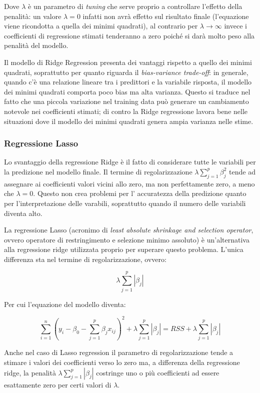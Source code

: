 Dove $\lambda$ è un parametro di \textit{tuning} che serve proprio a controllare l’effetto della penalità: un valore $\lambda=0$ infatti non avrà effetto sul risultato finale (l’equazione viene ricondotta a quella dei minimi quadrati), al contrario per $\lambda \to \infty$ invece i coefficienti di regressione stimati tenderanno a zero poiché si darà molto peso alla penalità del modello. \cite{lasso_vs_ridge}

Il modello di Ridge Regression presenta dei vantaggi rispetto a quello dei minimi quadrati, soprattutto per quanto riguarda il \textit{bias-variance trade-off}: in generale, quando c’è una relazione lineare tra i predittori e la variabile risposta, il modello dei minimi quadrati comporta poco bias ma alta varianza. Questo si traduce nel fatto che una piccola variazione nel training data può generare un cambiamento notevole nei coefficienti stimati; di contro la Ridge regressione lavora bene nelle situazioni dove il modello dei minimi quadrati genera ampia varianza nelle stime.\cite{tesi_polito}

\subsubsection{Regressione Lasso}\label{sssec:regressione-lasso}
Lo svantaggio della regressione Ridge è il fatto di considerare tutte le variabili per la predizione nel modello finale. Il termine di regolarizzazione $\lambda \sum_{j=1}^{p} \beta_{j}^{2}$ tende ad assegnare ai coefficienti valori vicini allo zero, ma non perfettamente zero, a meno che $\lambda = 0$.
Questo non crea problemi per l’ accuratezza della predizione quanto per l’interpretazione delle varabili, soprattutto quando il numero delle variabili diventa alto.

La regressione Lasso (acronimo di \textit{least absolute shrinkage and selection operator}, ovvero operatore di restringimento e selezione minimo assoluto) è un’alternativa alla regressione ridge utilizzata proprio per superare questo problema. L'unica differenza sta nel termine di regolarizzazione, ovvero:

$$\lambda \sum_{j=1}^{p}\left|\beta_{j}\right|$$\smallskip

Per cui l'equazione del modello diventa:

$$\sum_{i=1}^{n}\left(y_{i}-\beta_{0}-\sum_{j=1}^{p} \beta_{j} x_{i j}\right)^{2}+\lambda \sum_{j=1}^{p}\left|\beta_{j}\right|=R S S+\lambda \sum_{j=1}^{p}\left|\beta_{j}\right|$$\smallskip

Anche nel caso di Lasso regression il parametro di regolarizzazione tende a stimare i valori dei coefficienti verso lo zero ma, a differenza della regressione ridge, la penalità $\lambda \sum_{j=1}^{p}\left|\beta_{j}\right|$ costringe uno o più coefficienti ad essere esattamente zero per certi valori di $\lambda$. \cite{tesi_polito}

